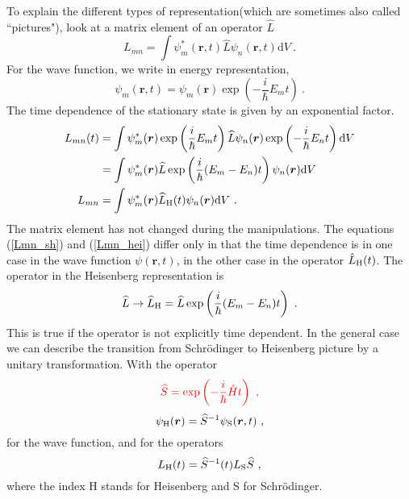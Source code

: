 \documentclass[11pt,a4paper]{article}
\renewcommand{\vec}[1]{\boldsymbol{#1}}
\newcommand{\dif}{\mathrm{d}}
\begin{document}
To explain the different types of representation(which are sometimes also called ``pictures"), look at a matrix element of an operator $\widehat{L}$
\begin{equation}
L_{mn} = \int \psi_m^\ast(\vec{r}, t) \widehat{L} \psi_n(\vec{r}, t) \dif V ~.
\label{Lmn_sh}
\end{equation}
For the wave function, we write in energy representation, 
\begin{equation}
\psi_m(\vec{r}, t) = \psi_m(\vec{r}) \exp \left(-\dfrac{i}{\hbar} E_m t \right) ~.
\end{equation}
The time dependence of the stationary state is given by an exponential factor. 
\begin{align}
\nonumber L_{mn}(t) &= \int \psi_m^\ast(\vec{r}) \exp \left(\dfrac{i}{\hbar} E_m t \right) \widehat{L} \psi_n(\vec{r}) \exp \left(-\dfrac{i}{\hbar} E_n t \right) \dif V \\
\nonumber &= \int \psi_m^\ast(\vec{r}) \widehat{L} \exp \left(\dfrac{i}{\hbar} (E_m -E_n) t \right) \psi_n(\vec{r}) \dif V \\
L_{mn} &= \int \psi_m^\ast(\vec{r}) \widehat{L}_{\rm H}(t) \psi_n(\vec{r}) \dif V ~.
\label{Lmn_hei}
\end{align}
The matrix element has not changed during the manipulations. The equations (\ref{Lmn_sh}) and (\ref{Lmn_hei}) differ only in that the time dependence is in one case in the wave function $\psi(\vec{r}, t)$, in the other case in the operator $\hat{L}_{\rm H}(t)$. The operator in the Heisenberg representation is 
\begin{equation}
\widehat{L} \rightarrow \widehat{L}_{\rm H} = \widehat{L} \exp \left(\dfrac{i}{\hbar} (E_m -E_n) t \right) ~.
\end{equation}
This is true if the operator is not explicitly time dependent. In the general case we can describe the transition from Schr\"odinger to Heisenberg picture by a unitary transformation. With the operator
\begin{equation}
\color{red} \widehat{S} = \exp \left(-\dfrac{i}{\hbar} \hat{H} t \right) ~,
\end{equation}
\begin{equation}
\psi_{\rm H}(\vec{r}) = \widehat{S}^{-1} \psi_{\rm S}(\vec{r}, t)  ~,
\end{equation}
for the wave function, and for the operators
\begin{equation}
L_{\rm H}(t) = \widehat{S}^{-1}(t) L_{\rm S} \widehat{S} ~,
\end{equation}
where the index H stands for Heisenberg and S for Schr\"odinger. 
\end{document}
